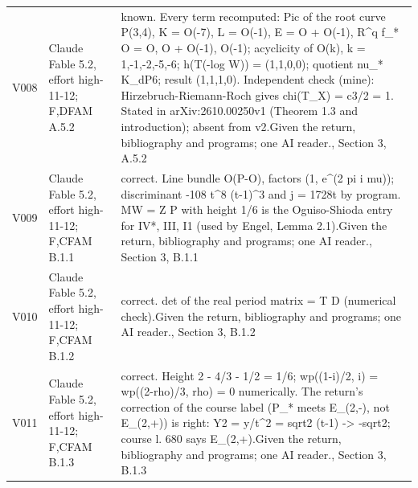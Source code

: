 \documentclass[11pt,a4paper]{article}
\theoremstyle{plain}
\theoremstyle{definition}
\begin{document}
\begin{longtable}{@{}L{.08\linewidth}L{.31\linewidth}L{.56\linewidth}@{}}
V008 & Claude Fable 5.2, effort high-11-12; F,D\newline FAM A.5.2 & known. Every term recomputed:\allowbreak{} Pic of the root curve P(3,4), K = O(-7), L = O(-1), E = O + O(-1), R\textasciicircum{}q f\_\allowbreak{}* O = O, O + O(-1), O(-1); acyclicity of O(k), k = 1,-1,-2,-5,-6; h(T(-log W)) = (1,1,0,0); quotient nu\_\allowbreak{}* K\_\allowbreak{}dP6; result (1,1,1,0). Independent check (mine):\allowbreak{} Hirzebruch-Riemann-Roch gives chi(T\_\allowbreak{}X) = c3/\allowbreak{}2 = 1. Stated in arXiv:\allowbreak{}2610.00250v1 (Theorem 1.3 and introduction); absent from v2.\newline Given the return, bibliography and programs; one AI reader.\newline {}, Section 3, A.5.2\\
V009 & Claude Fable 5.2, effort high-11-12; F,C\newline FAM B.1.1 & correct. Line bundle O(P-O), factors (1, e\textasciicircum{}(2 pi i mu)); discriminant -108 t\textasciicircum{}8 (t-1)\textasciicircum{}3 and j = 1728t by program. MW = Z P with height 1/\allowbreak{}6 is the Oguiso-Shioda entry for IV*, III, I1 (used by Engel, Lemma 2.1).\newline Given the return, bibliography and programs; one AI reader.\newline {}, Section 3, B.1.1\\
V010 & Claude Fable 5.2, effort high-11-12; F,C\newline FAM B.1.2 & correct. det of the real period matrix = T D (numerical check).\newline Given the return, bibliography and programs; one AI reader.\newline {}, Section 3, B.1.2\\
V011 & Claude Fable 5.2, effort high-11-12; F,C\newline FAM B.1.3 & correct. Height 2 - 4/\allowbreak{}3 - 1/\allowbreak{}2 = 1/\allowbreak{}6; wp((1-i)/\allowbreak{}2, i) = wp((2-rho)/\allowbreak{}3, rho) = 0 numerically. The return's correction of the course label (P\_\allowbreak{}* meets E\_\allowbreak{}(2,-), not E\_\allowbreak{}(2,+)) is right:\allowbreak{} Y2 = y/\allowbreak{}t\textasciicircum{}2 = sqrt2 (t-1) -> -sqrt2; course l. 680 says E\_\allowbreak{}(2,+).\newline Given the return, bibliography and programs; one AI reader.\newline {}, Section 3, B.1.3\\

\end{longtable}
\end{document}

